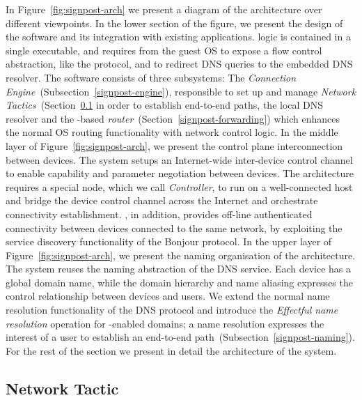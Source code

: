 
In Figure~\ref{fig:signpost-arch} we present
a diagram of the \signpost architecture over different viewpoints. 
In the lower section of the figure, we present the design of the \signpost
software and its integration with existing applications.  \signpost logic is
contained in a single executable, and requires from the guest OS to expose a
flow control abstraction, like the 
\of protocol, and to redirect DNS queries to the embedded DNS resolver.
The software consists of three subsystems: The {\it Connection
  Engine}~(Subsection~\ref{signpost-engine}), responsible to set up and manage
{\it Network Tactics}~(Section~\ref{signpost-tactic} in order to establish
end-to-end paths, the local DNS resolver and the \of-based {\it \signpost
  router}~(Section~\ref{signpost-forwarding}) which enhances the normal OS
routing functionality with \signpost network control logic.  
In the middle layer of Figure~\ref{fig:signpost-arch}, we present the control
plane interconnection between \signpost devices. The system setups an
Internet-wide inter-device control channel to enable capability and parameter
negotiation between devices. The architecture requires a special \signpost node,
which we call \emph{\signpost Controller}, to run on a well-connected host and
bridge the device control channel across the Internet and orchestrate
connectivity establishment. \signpost, in addition, provides off-line
authenticated connectivity between devices connected to the same network, by
exploiting the service discovery functionality of the Bonjour protocol. 
In the upper layer of Figure~\ref{fig:signpost-arch}, we present the naming
organisation of the \signpost architecture. The system reuses the naming
abstraction of the DNS service. Each device has a global domain name, while the
domain hierarchy and name aliasing expresses the control relationship between
devices and users.  We extend the normal name resolution functionality of the
DNS protocol and introduce the  {\it Effectful name resolution} operation for
\signpost-enabled domains; a name resolution expresses the interest of a user to
establish an end-to-end path~(Subsection~\ref{signpost-naming}). For the rest of
the section we present in detail the architecture of the \signpost system. 

\subsection{Network Tactic} \label{signpost-tactic}

